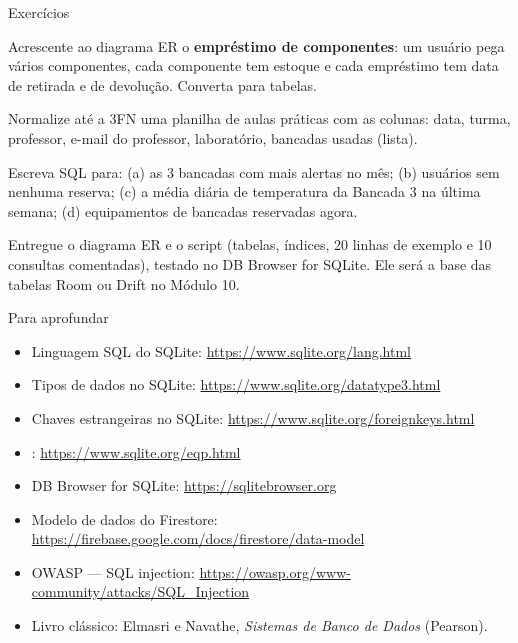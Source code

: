 \documentclass[aspectratio=169,10pt]{beamer}
\begin{document}
\begin{frame}{Exercícios}
  \begin{exercicio}
    Acrescente ao diagrama ER o \textbf{empréstimo de componentes}: um usuário pega vários componentes, cada componente tem estoque e cada empréstimo tem data de retirada e de devolução. Converta para tabelas.
  \end{exercicio}
  \begin{exercicio}
    Normalize até a 3FN uma planilha de aulas práticas com as colunas: data, turma, professor, e-mail do professor, laboratório, bancadas usadas (lista).
  \end{exercicio}
  \begin{exercicio}
    Escreva SQL para: (a) as 3 bancadas com mais alertas no mês; (b) usuários sem nenhuma reserva; (c) a média diária de temperatura da Bancada 3 na última semana; (d) equipamentos de bancadas reservadas agora.
  \end{exercicio}
  \begin{projeto}
    Entregue o diagrama ER e o script  (tabelas, índices, 20 linhas de exemplo e 10 consultas comentadas), testado no DB Browser for SQLite. Ele será a base das tabelas Room ou Drift no Módulo 10.
  \end{projeto}
\end{frame}

\begin{frame}{Para aprofundar}
  \small
  \begin{itemize}
    \item Linguagem SQL do SQLite: \url{https://www.sqlite.org/lang.html}
    \item Tipos de dados no SQLite: \url{https://www.sqlite.org/datatype3.html}
    \item Chaves estrangeiras no SQLite: \url{https://www.sqlite.org/foreignkeys.html}
    \item {}: \url{https://www.sqlite.org/eqp.html}
    \item DB Browser for SQLite: \url{https://sqlitebrowser.org}
    \item Modelo de dados do Firestore: \url{https://firebase.google.com/docs/firestore/data-model}
    \item OWASP --- SQL injection: \url{https://owasp.org/www-community/attacks/SQL_Injection}
    \item Livro clássico: Elmasri e Navathe, \emph{Sistemas de Banco de Dados} (Pearson).
  \end{itemize}
\end{frame}
\end{document}
